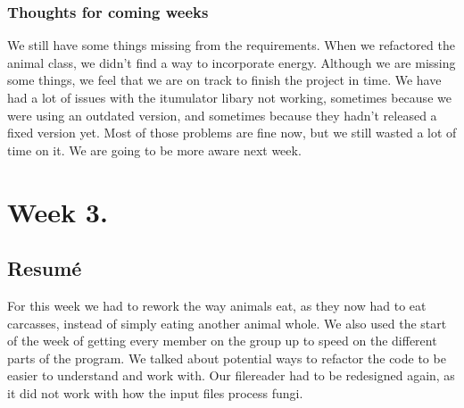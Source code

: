 \documentclass[11pt]{article}
\begin{document}
    \subsubsection*{Thoughts for coming weeks}
    We still have some things missing from the requirements. When we refactored the animal class, we didn't find a way to incorporate energy. 
    Although we are missing some things, we feel that we are on track to finish the project in time. We have had a lot of issues with the 
    itumulator libary not working, sometimes because we were using an outdated version, and sometimes because they hadn't released a fixed version yet. 
    Most of those problems are fine now, but we still wasted a lot of time on it. We are going to be more aware next week. 
    \newpage
    \section*{Week 3.}
    \subsection*{Resumé}
    For this week we had to rework the way animals eat, as they now had to eat carcasses, instead of simply eating another animal whole. 
    We also used the start of the week of getting every member on the group up to speed on the different parts of the program. 
    We talked about potential ways to refactor the code to be easier to understand and work with. 
    Our filereader had to be redesigned again, as it did not work with how the input files process fungi. 
\end{document}
